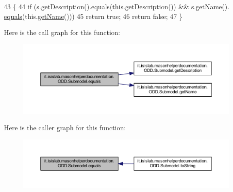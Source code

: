 \begin{DoxyCode}
43                                      \{
44         \textcolor{keywordflow}{if} (s.getDescription().equals(this.getDescription()) && s.getName().
      \hyperlink{classit_1_1isislab_1_1masonhelperdocumentation_1_1_o_d_d_1_1_submodel_a2bb03f7d258a5e882219eaf7dd3b8257}{equals}(this.\hyperlink{classit_1_1isislab_1_1masonhelperdocumentation_1_1_o_d_d_1_1_submodel_a25ea4ffe85d1b3ce42d22160e573cb50}{getName}()))
45             \textcolor{keywordflow}{return} \textcolor{keyword}{true};
46         \textcolor{keywordflow}{return} \textcolor{keyword}{false};
47     \}
\end{DoxyCode}


Here is the call graph for this function\-:
\nopagebreak
\begin{figure}[H]
\begin{center}
\leavevmode
\includegraphics[width=350pt]{classit_1_1isislab_1_1masonhelperdocumentation_1_1_o_d_d_1_1_submodel_a2bb03f7d258a5e882219eaf7dd3b8257_cgraph}
\end{center}
\end{figure}




Here is the caller graph for this function\-:
\nopagebreak
\begin{figure}[H]
\begin{center}
\leavevmode
\includegraphics[width=350pt]{classit_1_1isislab_1_1masonhelperdocumentation_1_1_o_d_d_1_1_submodel_a2bb03f7d258a5e882219eaf7dd3b8257_icgraph}
\end{center}
\end{figure}


